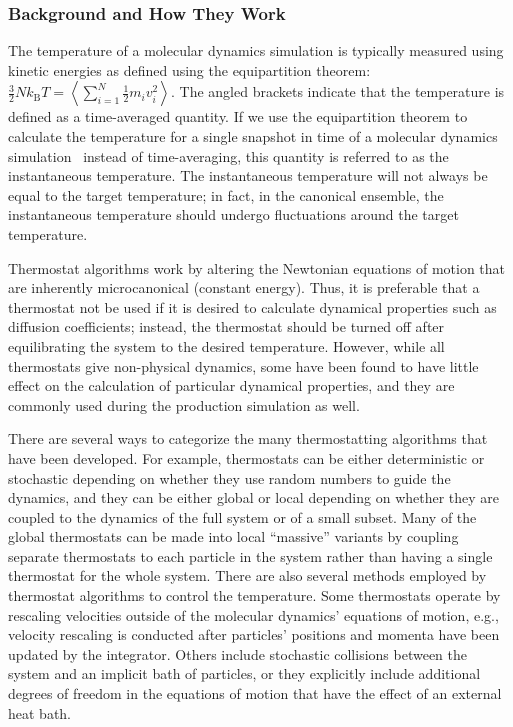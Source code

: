 \documentclass[9pt,bestpractices]{livecoms}
\begin{document}
\subsubsection{Background and How They Work}

The temperature of a molecular dynamics simulation is typically measured using kinetic energies as defined using the equipartition theorem: $\frac{3}{2} N k_{\text{B}} T = \left<\sum_{i=1}^{N} \frac{1}{2} m_i v_i^2\right>$.
The angled brackets indicate that the temperature is defined as a time-averaged quantity.
If we use the equipartition theorem to calculate the temperature for a single snapshot in time of a molecular dynamics simulation~\cite{Zuckerman:2010:, LeachBook} instead of time-averaging, this quantity is referred to as the instantaneous temperature.
The instantaneous temperature will not always be equal to the target temperature; in fact, in the canonical ensemble, the instantaneous temperature should undergo fluctuations around the target temperature.

Thermostat algorithms work by altering the Newtonian equations of motion that are inherently microcanonical (constant energy).
Thus, it is preferable that a thermostat not be used if it is desired to calculate dynamical properties such as diffusion coefficients; instead, the thermostat should be turned off after equilibrating the system to the desired temperature.
However, while all thermostats give non-physical dynamics, some have been found to have little effect on the calculation of particular dynamical properties, and they are commonly used during the production simulation as well\cite{Basconi:2013:JChemTheoryComput}.

There are several ways to categorize the many thermostatting algorithms that have been developed.
For example, thermostats can be either deterministic or stochastic depending on whether they use random numbers to guide the dynamics, and they can be either global or local depending on whether they are coupled to the dynamics of the full system or of a small subset.
Many of the global thermostats can be made into local ``massive'' variants by coupling separate thermostats to each particle in the system rather than having a single thermostat for the whole system.
There are also several methods employed by thermostat algorithms to control the temperature.
Some thermostats operate by rescaling velocities outside of the molecular dynamics' equations of motion, e.g., velocity rescaling is conducted after particles' positions and momenta have been updated by the integrator.
Others include stochastic collisions between the system and an implicit bath of particles, or they explicitly include additional degrees of freedom in the equations of motion that have the effect of an external heat bath.
\end{document}
